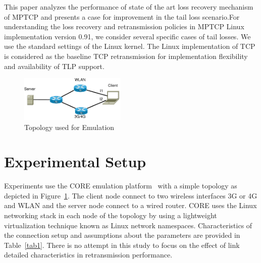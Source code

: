 \documentclass[10pt,conference,compsoc]{IEEEtran}
\begin{document}

This paper analyzes the performance of state of the art loss recovery mechanism of MPTCP and presents a case for improvement in the tail loss scenario.For understanding the loss recovery and retransmission policies in MPTCP Linux implementation version 0.91, we consider several specific cases of tail losses. We use the standard settings of the Linux kernel. The Linux implementation of TCP is considered as the baseline TCP retransmission for implementation flexibility and availability of TLP support.

\begin{figure}[!ht]
\begin{center}
\includegraphics[angle=0, width=0.45\textwidth]{images/fortest.pdf}
\caption{Topology used for Emulation}\label{fig1}
\end{center}
\end{figure}
\section{Experimental Setup}\label{exsetup}

Experiments use the CORE emulation platform~\cite{CORE} with a simple topology as depicted in Figure~\ref{fig1}. The client node connect to two wireless interfaces 3G or 4G and WLAN and the server node connect to a wired router.
CORE uses the Linux networking stack in each node of the topology by using a lightweight virtualization technique known as Linux network namespaces.
Characteristics of the connection setup and assumptions about the parameters are provided in Table~\ref{tab1}.
There is no attempt in this study to focus on the effect of link detailed characteristics in retransmission performance.
\end{document}
